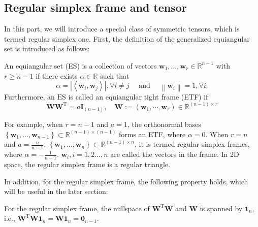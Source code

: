	
		\subsection{Regular  simplex  frame  and  tensor}
		In this part,  we  will  introduce  a  special class of symmetric   tensors,  which is termed   
		regular  simplex  one. 
		First,  the    definition of the  generalized  equiangular set  is  introduced as  follows:  
		\begin{definition}
		An equiangular set (ES) is a collection of vectors $\mathbf{w}_{1}, \ldots, \mathbf{w}_{r} \in \mathbb{R}^{n-1}$ with $r \geq n-1$ if there exists $\alpha \in \mathbb{R}$ such that
		$$
		\alpha=
		\left|\left\langle\mathbf{w}_{i}, \mathbf{w}_{j}\right\rangle\right|, \forall i \neq j \quad \text { and } \quad\left\|\mathbf{w}_{i}\right\|=1, \forall i .
		$$
		Furthermore, an $\mathrm{ES}$ is  called  an equiangular tight frame (ETF)  if  
		\begin{equation}
	\mathbf{W} \mathbf{W}^{\mathrm T}=a \mathbf{I}_{(n-1)}, \quad \mathbf{W}:=\left(\mathbf{w}_{1},  \cdots,  \mathbf{w}_{r}\right) \in \mathbb{R}^{(n-1) \times r}
	\end{equation}
	\end{definition}
	
		
	For  example, 
	when   $r=n-1$ and $a=1$, the  orthonormal bases
	 $\left\{\mathbf{w}_{1}, \ldots, \mathbf{w}_{n-1}\right\} \subset \mathbb{R}^{(n-1) \times (n-1)}$
	 forms  an  ETF,  where $\alpha =0$.
	 When    $r=n$ and $a=\frac {n}{n-1}$,   $\left\{\mathbf{w}_{1}, \ldots, \mathbf{w}_{n}\right\} \subset \mathbb{R}^{(n-1) \times  n}$, it  is   termed  
	 regular  simplex frames,  
	 where   $ 
	 \alpha = - \frac{1}{n-1}$.
	 $\mathbf{w}_{i}, i=1,2 \dots, n$   are  called  the  vectors  in  the  frame. 
	 In  2D  space,  
	 the  regular simplex  frame  is  a   regular  triangle.

	 
	 
	 In  addition, for the regular  simplex frame,  the  following property  holds,  which  will be  useful in  the  later  section: 
	 
	 \begin{property}\label{regularproperty}
	For  the  regular  simplex   frame,  the nullspace of 
	 $ \mathbf{W}^{\mathrm T} \mathbf{W} $
	  and 	 $  \mathbf{W} $
	   is spanned by 
	   $ \mathbf{1}_{n} $,
	   i.e., 
	    $ 
	    \mathbf{W}^{\mathrm T} \mathbf{W}  \mathbf{1}_{n} 
	    =
	     \mathbf{W}  \mathbf{1}_{n} 
	     =
	     \mathbf{0}_{n-1}
	    $.
	   	 \end{property}
		
